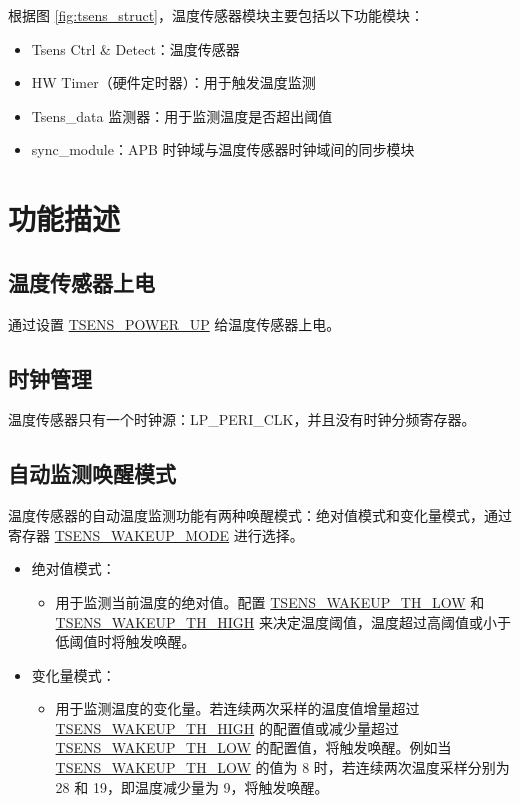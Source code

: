 \documentclass[main\_\_CN.tex]{subfiles}
\begin{document}
根据图 \ref{fig:tsens_struct}，温度传感器模块主要包括以下功能模块：

\begin{itemize}
\item Tsens Ctrl \& Detect：温度传感器
    \item HW Timer（硬件定时器）：用于触发温度监测
    \item Tsens\_data 监测器：用于监测温度是否超出阈值
    \item sync\_module：APB 时钟域与温度传感器时钟域间的同步模块
\end{itemize}

\section{功能描述}

\subsection{温度传感器上电}
通过设置 \hyperref[fielddesc:TSENSPOWERUP]{TSENS\_POWER\_UP} 给温度传感器上电。

\subsection{时钟管理}
温度传感器只有一个时钟源：LP\_PERI\_CLK，并且没有时钟分频寄存器。

\subsection{自动监测唤醒模式}

温度传感器的自动温度监测功能有两种唤醒模式：绝对值模式和变化量模式，通过寄存器 \hyperref[fielddesc:TSENSWAKEUPMODE]{TSENS\_WAKEUP\_MODE} 进行选择。

   \begin{itemize}
       \item 绝对值模式：
           \begin{itemize}
                \item 用于监测当前温度的绝对值。配置 \hyperref[fielddesc:TSENSWAKEUPTHLOW]{TSENS\_WAKEUP\_TH\_LOW} 和 \hyperref[fielddesc:TSENSWAKEUPTHHIGH]{TSENS\_WAKEUP\_TH\_HIGH} 来决定温度阈值，温度超过高阈值或小于低阈值时将触发唤醒。
           \end{itemize}
       \item 变化量模式：
            \begin{itemize}
                \item 用于监测温度的变化量。若连续两次采样的温度值增量超过 \hyperref[fielddesc:TSENSWAKEUPTHHIGH]{TSENS\_WAKEUP\_TH\_HIGH} 的配置值或减少量超过 \hyperref[fielddesc:TSENSWAKEUPTHLOW]{TSENS\_WAKEUP\_TH\_LOW} 的配置值，将触发唤醒。例如当 \hyperref[fielddesc:TSENSWAKEUPTHLOW]{TSENS\_WAKEUP\_TH\_LOW} 的值为 8 时，若连续两次温度采样分别为 28 和 19，即温度减少量为 9，将触发唤醒。
            \end{itemize}
    \end{itemize}
\end{document}
